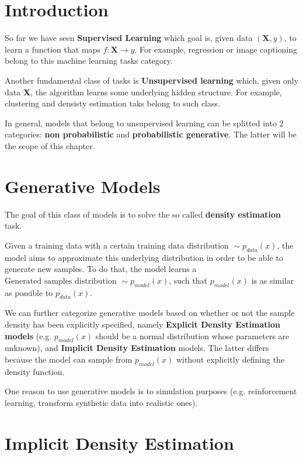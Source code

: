 \section{Introduction}
So far we have seen \textbf{Supervised Learning} which goal is, given data $(\textbf{X},y)$, to learn a function that maps $f: \textbf{X} \longrightarrow y$. For example, regression or image captioning belong to this machine learning tasks category. 

Another fundamental class of tasks is \textbf{Unsupervised learning} which, given only data \textbf{X}, the algorithm learns some underlying hidden structure. For example, clustering and densisty estimation taks belong to such class.

In general, models that belong to unsupervised learning can  be splitted into 2 categories: \textbf{non probabilistic} and \textbf{probabilistic generative}. The latter will be the scope of this chapter.

\section{Generative Models}
The goal of this class of models is to solve the so called \textbf{density estimation} task. 


Given a training data with a certain $\text{training data distribution }  \sim p_{data}(x)$, the model aims to approximate this underlying distribution in order to be able to generate new samples. To do that, the model learns a $\text{Generated samples distribution } \sim p_{model}(x)$, such that $ p_{model}(x)$ is as similar as possible to $ p_{data}(x)$.


We can further categorize generative models based on whether or not the sample density has been explicitly specified, namely \textbf{Explicit Density Estimation models} (e.g. $p_{model}(x)$ should be a normal distribution whose parameters are unknown), and \textbf{Implicit Density Estimation} models. The latter differs because the model can sample from $p_{model}(x)$ without explicitly defining the density function.

One reason to use generative models is to simulation purposes (e.g. reinforcement learning, transform synthetic data into realistic ones).

\section{Implicit Density Estimation}


